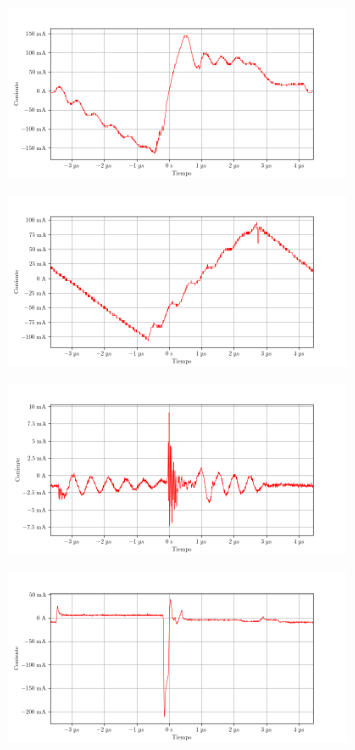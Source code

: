 \begin{figure}[ht]
    \centering
    \includegraphics[width=0.8\textwidth]{images/capturas-osciloscopio/17-11-2022/65.png}
    \caption{}
    \label{fig:osc:65}
\end{figure}

\begin{figure}[ht]
    \centering
    \includegraphics[width=0.8\textwidth]{images/capturas-osciloscopio/17-11-2022/66.png}
    \caption{}
    \label{fig:osc:66}
\end{figure}

\begin{figure}[ht]
    \centering
    \includegraphics[width=0.8\textwidth]{images/capturas-osciloscopio/17-11-2022/67.png}
    \caption{}
    \label{fig:osc:67}
\end{figure}

\begin{figure}[ht]
    \centering
    \includegraphics[width=0.8\textwidth]{images/capturas-osciloscopio/17-11-2022/68.png}
    \caption{}
    \label{fig:osc:68}
\end{figure}
